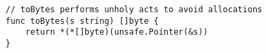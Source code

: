 \begin{lstlisting}[language=Golang, label=lst:todo-unsafe-snippet, caption=Todo: unsafe code snippet?]
// toBytes performs unholy acts to avoid allocations
func toBytes(s string) []byte {
    return *(*[]byte)(unsafe.Pointer(&s))
}
\end{lstlisting}